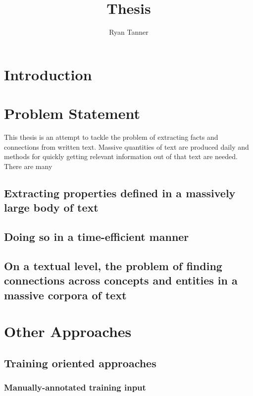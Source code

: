 \documentclass[11pt]{article}
\title{Thesis}
\author{Ryan Tanner}
\begin{document}
\maketitle

\tableofcontents

\section{Introduction}

\section{Problem Statement}

This thesis is an attempt to tackle the problem of extracting facts and connections from written text.  Massive quantities of text are produced daily and methods for quickly getting relevant information out of that text are needed.  There are many 

\subsection{Extracting properties defined in a massively large body of text}



\subsection{Doing so in a time-efficient manner}

\subsection{On a textual level, the problem of finding connections across concepts and entities in a massive corpora of text}


\section{Other Approaches}

\subsection{Training oriented approaches}

\subsubsection{Manually-annotated training input}
\end{document}
